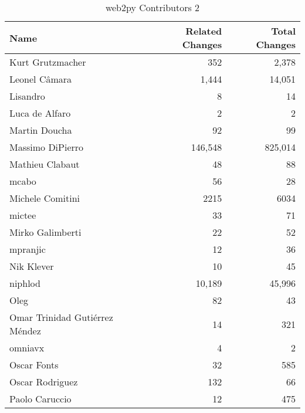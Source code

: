 \documentclass[a4paper,man,natbib,floatsintext]{apa6}
\begin{document}
\begin{table}[ht]
\caption{web2py Contributors 2}
\label{tab:contribs-3-2}
\begin{tabular}{|l|r|r|}
\hline
Name                           & Related Changes & Total Changes \\ \hline
Kurt Grutzmacher               & 352             & 2,378         \\ \hline
Leonel Câmara                  & 1,444           & 14,051        \\ \hline
Lisandro                       & 8               & 14            \\ \hline
Luca de Alfaro                 & 2               & 2             \\ \hline
Martin Doucha                  & 92              & 99            \\ \hline
Massimo DiPierro               & 146,548         & 825,014       \\ \hline
Mathieu Clabaut                & 48              & 88            \\ \hline
mcabo                          & 56              & 28            \\ \hline
Michele Comitini               & 2215            & 6034          \\ \hline
mictee                         & 33              & 71            \\ \hline
Mirko Galimberti               & 22              & 52            \\ \hline
mpranjic                       & 12              & 36            \\ \hline
Nik Klever                     & 10              & 45            \\ \hline
niphlod                        & 10,189          & 45,996        \\ \hline
Oleg                           & 82              & 43            \\ \hline
Omar Trinidad Gutiérrez Méndez & 14              & 321           \\ \hline
omniavx                        & 4               & 2             \\ \hline
Oscar Fonts                    & 32              & 585           \\ \hline
Oscar Rodriguez                & 132             & 66            \\ \hline
Paolo Caruccio                 & 12              & 475           \\ \hline

\end{tabular}
\end{table}
\end{document}
